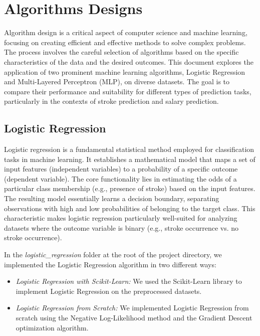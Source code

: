 \documentclass[runningheads]{paper}
\begin{document}
\section{Algorithms Designs}
Algorithm design is a critical aspect of computer science and machine learning, 
focusing on creating efficient and effective methods to solve complex problems. 
The process involves the careful selection of algorithms based on the specific 
characteristics of the data and the desired outcomes. This document explores the 
application of two prominent machine learning algorithms, Logistic Regression and 
Multi-Layered Perceptron (MLP), on diverse datasets. The goal is to compare their 
performance and suitability for different types of prediction tasks, particularly 
in the contexts of stroke prediction and salary prediction.

\subsection{Logistic Regression}
Logistic regression is a fundamental statistical method employed for classification 
tasks in machine learning. It establishes a mathematical model that maps a set
of input features (independent variables) to a probability of a specific outcome 
(dependent variable). The core functionality lies in estimating the odds of a 
particular class membership (e.g., presence of stroke) based on the input 
features. The resulting model essentially learns a decision boundary, 
separating observations with high and low probabilities of belonging to the 
target class. This characteristic makes logistic regression particularly 
well-suited for analyzing datasets where the outcome variable is binary 
(e.g., stroke occurrence vs. no stroke occurrence).

In the \textit{logistic\_regression} folder at the root of the project directory,
we implemented the Logistic Regression algorithm in two different ways:

\begin{itemize}
    \item \textit{Logistic Regression with Scikit-Learn:} We used the Scikit-Learn
    library to implement Logistic Regression on the preprocessed datasets.
    \item \textit{Logistic Regression from Scratch:} We implemented Logistic Regression
    from scratch using the Negative Log-Likelihood method and the Gradient Descent
    optimization algorithm.
\end{itemize}
\end{document}
